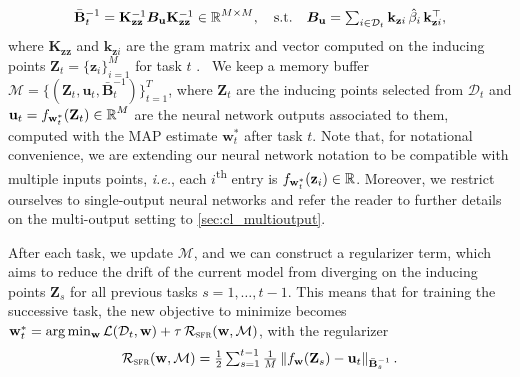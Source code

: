 \documentclass{article}
\makeatletter
\newcommand{\ie}{\textit{i.e.\@}\xspace}
\newcommand{\our}{\textsc{sfr}\xspace}
\newcommand{\dataset}{\ensuremath{\mathcal{D}}}
\newcommand{\weights}{\ensuremath{\mathbf{w}}}
\newcommand{\mathbold}[1]{\bm{#1}}
\newcommand{\mbf}[1]{\mathbf{#1}}
\newcommand{\MB}{\mbf{B}}
\newcommand{\MZ}{\mbf{Z}}
\newcommand{\T}{\top}
\newcommand{\MBeta}[0]{\mathbold{B}}
\newcommand{\vz}{\mbf{z}}
\newcommand{\vu}{\mbf{u}}
\newcommand{\vw}{\mbf{w}}
\newcommand{\MKzz}{\mbf{K}_{\mbf{z}\mbf{z}}}
\newcommand{\vkzi}{\mbf{k}_{\mbf{z}i}}
\makeatother
\begin{document}
%
\begin{equation}\textstyle
 	\bar{\MB}^{-1}_t = \MKzz^{-1} \MBeta_\vu \MKzz^{-1} \in \R^{M \times M}, 
 	\quad \text{s.t.} \quad
 	\MBeta_{\vu} =  \sum_{i \in \dataset_t} \vkzi \,\hat{\beta}_{i} \, \vkzi^{\T} ,    
\end{equation}
%
where $\MKzz$ and $\vkzi$ are the gram matrix and vector computed on the inducing points $\MZ_t = \{\vz_i\}_{i=1}^M$ for task $t$ .\
%
We keep a memory buffer $\mathcal{M} = \{(\MZ_t, \vu_t, \bar{\MB}^{-1}_t)\}_{t=1}^T$, where $\MZ_t$ are the inducing points selected from $\dataset_t$ and  $\vu_t = f_{\vw_t^*}(\MZ_t)\in \R^{M}$ are the neural network outputs associated to them, computed with the MAP estimate $\weights_t^*$ after task $t$. Note that, for notational convenience, we are extending our neural network notation to be compatible with multiple inputs points, \ie, each $i$\textsuperscript{th} entry is $f_{\weights_t^*}(\vz_i)\in \R$. Moreover, we restrict ourselves to single-output neural networks and refer the reader to further details on the multi-output setting to \cref{sec:cl_multioutput}. 

After each task, we update $\mathcal{M}$, and we can construct a regularizer term, which aims to reduce the drift of the current model from diverging on the inducing points $\MZ_s$ for all previous tasks $ s = 1, \ldots, t-1$. This means that for training  the successive task, the new objective to minimize becomes $\weights_t^* = \arg\min_{\weights} \mathcal{L}(\mathcal{D}_t, \weights) + \tau \, \mathcal{R}_\textrm{\our}(\weights, \mathcal{M})$, with the regularizer
%
\begin{equation}\label{eq-cl-regularizer}\textstyle
  \mathcal{R}_\mathrm{\our}(\weights, \mathcal{M}) = \frac{1}{2} \sum_{s=1}^{t-1} \frac{1}{M} 
	\left\lVert 
	f_{\weights}(\MZ_{s}) - \vu_t %
	\right\rVert_{\bar{\MB}^{-1}_{s}}.
\end{equation}
\end{document}
